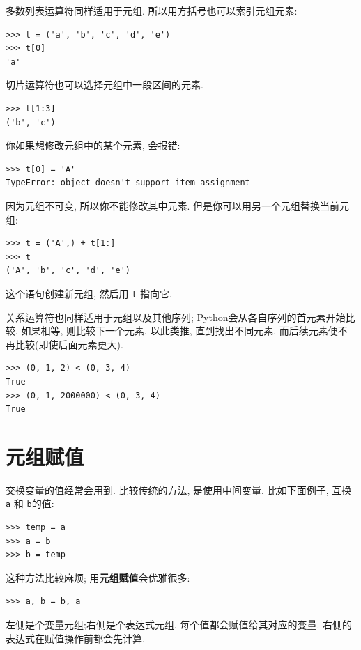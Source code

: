 \documentclass[10pt]{book}
\begin{document}
多数列表运算符同样适用于元组. 
所以用方括号也可以索引元组元素:

\begin{verbatim}
>>> t = ('a', 'b', 'c', 'd', 'e')
>>> t[0]
'a'
\end{verbatim}
%
切片运算符也可以选择元组中一段区间的元素. 

\begin{verbatim}
>>> t[1:3]
('b', 'c')
\end{verbatim}
%
你如果想修改元组中的某个元素, 会报错:

\begin{verbatim}
>>> t[0] = 'A'
TypeError: object doesn't support item assignment
\end{verbatim}
%
因为元组不可变, 所以你不能修改其中元素. 
但是你可以用另一个元组替换当前元组:

\begin{verbatim}
>>> t = ('A',) + t[1:]
>>> t
('A', 'b', 'c', 'd', 'e')
\end{verbatim}
%
这个语句创建新元组, 然后用 {\tt t} 指向它. 

关系运算符也同样适用于元组以及其他序列;
Python会从各自序列的首元素开始比较, 如果相等, 则比较下一个元素, 
以此类推, 直到找出不同元素. 
而后续元素便不再比较(即使后面元素更大). 

\begin{verbatim}
>>> (0, 1, 2) < (0, 3, 4)
True
>>> (0, 1, 2000000) < (0, 3, 4)
True
\end{verbatim}



\section{元组赋值}
\label{tuple.assignment}
交换变量的值经常会用到. 
比较传统的方法, 是使用中间变量. 
比如下面例子, 互换 {\tt a} 和 {\tt b}的值:

\begin{verbatim}
>>> temp = a
>>> a = b
>>> b = temp
\end{verbatim}
%
这种方法比较麻烦; 用{\bf 元组赋值}会优雅很多:

\begin{verbatim}
>>> a, b = b, a
\end{verbatim}
%
左侧是个变量元组;右侧是个表达式元组. 
每个值都会赋值给其对应的变量. 
右侧的表达式在赋值操作前都会先计算. 
\end{document}
